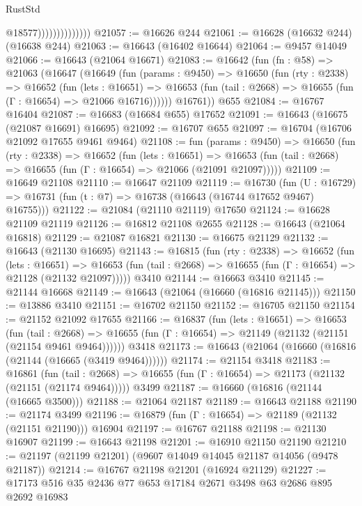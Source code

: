 \begin{lexlean}{RustStd}
\begin{coremodule}
                                @18577))))))))))))))
@21057 := @16626 @244
@21061 := @16628 (@16632 @244) (@16638 @244)
@21063 := @16643 (@16402 @16644)
@21064 := @9457 @14049
@21066 := @16643 (@21064 @16671)
@21083 := @16642
    (fun (fn : @58) =>
    @21063
      (@16647
        (@16649
          (fun (params : @9450) =>
          @16650
            (fun (rty : @2338) =>
            @16652
              (fun (lets : @16651) =>
              @16653 (fun (tail : @2668) => @16655 (fun (Γ : @16654) => @21066 @16716))))))
        @16761))
    @655
@21084 := @16767 @16404
@21087 := @16683 (@16684 @655) @17652
@21091 := @16643 (@16675 (@21087 @16691) @16695)
@21092 := @16707 @655
@21097 := @16704 (@16706 @21092 @17655 @9461 @9464)
@21108 := fun (params : @9450) =>
  @16650
    (fun (rty : @2338) =>
    @16652
      (fun (lets : @16651) =>
      @16653 (fun (tail : @2668) => @16655 (fun (Γ : @16654) => @21066 (@21091 @21097)))))
@21109 := @16649 @21108
@21110 := @16647 @21109
@21119 := @16730
    (fun (U : @16729) => @16731 (fun (t : @7) => @16738 (@16643 (@16744 @17652 @9467) @16755)))
@21122 := @21084 (@21110 @21119) @17650
@21124 := @16628 @21109 @21119
@21126 := @16812 @21108 @2655
@21128 := @16643 (@21064 @16818)
@21129 := @21087 @16821
@21130 := @16675 @21129
@21132 := @16643 (@21130 @16695)
@21143 := @16815
    (fun (rty : @2338) =>
    @16652
      (fun (lets : @16651) =>
      @16653 (fun (tail : @2668) => @16655 (fun (Γ : @16654) => @21128 (@21132 @21097)))))
    @3410
@21144 := @16663 @3410
@21145 := @21144 @16668
@21149 := @16643 (@21064 (@16660 (@16816 @21145)))
@21150 := @13886 @3410
@21151 := @16702 @21150
@21152 := @16705 @21150
@21154 := @21152 @21092 @17655
@21166 := @16837
    (fun (lets : @16651) =>
    @16653
      (fun (tail : @2668) =>
      @16655 (fun (Γ : @16654) => @21149 (@21132 (@21151 (@21154 @9461 @9464))))))
    @3418
@21173 := @16643 (@21064 (@16660 (@16816 (@21144 (@16665 (@3419 @9464))))))
@21174 := @21154 @3418
@21183 := @16861
    (fun (tail : @2668) => @16655 (fun (Γ : @16654) => @21173 (@21132 (@21151 (@21174 @9464)))))
    @3499
@21187 := @16660 (@16816 (@21144 (@16665 @3500)))
@21188 := @21064 @21187
@21189 := @16643 @21188
@21190 := @21174 @3499
@21196 := @16879 (fun (Γ : @16654) => @21189 (@21132 (@21151 @21190))) @16904
@21197 := @16767 @21188
@21198 := @21130 @16907
@21199 := @16643 @21198
@21201 := @16910 @21150 @21190
@21210 := @21197 (@21199 @21201) (@9607 @14049 @14045 @21187 @14056 (@9478 @21187))
@21214 := @16767 @21198 @21201 (@16924 @21129)
@21227 := @17173 @516 @35 @2436 @77 @653 @17184 @2671 @3498 @63 @2686 @895 @2692 @16983

\end{coremodule}
\end{lexlean}
